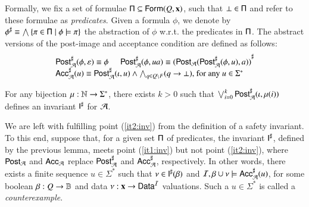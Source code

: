 \documentclass[10pt]{llncs}
\begin{document}
Formally, we fix a set of formulae $\mathsf{\Pi} \subseteq
\mathsf{Form}(Q,\mathbf x)$, such that $\bot \in \mathsf{\Pi}$ and refer to these
formulae as \emph{predicates}. Given a formula $\phi$, we denote by
${\phi}^\sharp \equiv \bigwedge \left\{ \pi \in \mathsf{\Pi} \mid \phi \models
  \pi \right\}$ the abstraction of $\phi$ w.r.t. the predicates in
$\mathsf{\Pi}$. The abstract versions of the post-image and acceptance
condition are defined as follows:
\[\begin{array}{l}
{\mathsf{Post}}^\sharp_{\mathcal{A}}(\phi,\varepsilon) \equiv \phi \hspace*{5mm}
{\mathsf{Post}}^\sharp_{\mathcal{A}}(\phi,ua) \equiv {(\mathsf{Post}_{\mathcal{A}}({\mathsf{Post}}^\sharp_{\mathcal{A}}(\phi,u),a))}^\sharp \\
{\mathsf{Acc}}^\sharp_{\mathcal{A}}(u) \equiv {\mathsf{Post}}^\sharp_{\mathcal{A}}(\iota,u) \wedge \bigwedge_{q \in Q \setminus F} 
(q \rightarrow \bot)\text{, for any $u \in \Sigma^*$}
\end{array}\]

\begin{lemma}\label{lemma:abstract-invariant}
  For any bijection $\mu : {\bf \mathbb{N}} \rightarrow \Sigma^*$, there exists
  $k>0$ such that $\bigvee_{i=0}^k {\mathsf{Post}}^\sharp_{\mathcal{A}}(\iota,\mu(i))$ defines
  an invariant ${\mathsf{I}}^\sharp$ for $\mathcal{A}$. 
\end{lemma}


We are left with fulfilling point (\ref{it2:inv}) from the definition
of a safety invariant. To this end, suppose that, for a given set
$\mathsf{\Pi}$ of predicates, the invariant ${\mathsf{I}}^\sharp$, defined by the
previous lemma, meets point (\ref{it1:inv}) but not point
(\ref{it2:inv}), where $\mathsf{Post}_{\mathcal{A}}$ and $\mathsf{Acc}_{\mathcal{A}}$ replace
${\mathsf{Post}}^\sharp_{\mathcal{A}}$ and ${\mathsf{Acc}}^\sharp_{\mathcal{A}}$, respectively. In other words,
there exists a finite sequence $u \in \Sigma^*$ such that $\nu \in
{\mathsf{I}}^\sharp(\beta)$ and $\mathcal{I},\beta\cup\nu \models {\mathsf{Acc}}^\sharp_{\mathcal{A}}(u)$,
for some boolean $\beta : Q \rightarrow \mathbb{B}$ and data $\nu :
\mathbf x \rightarrow \mathsf{Data}^{\mathcal{I}}$ valuations. Such a $u\in\Sigma^*$ is
called a \emph{counterexample}.
\end{document}
